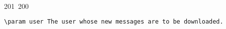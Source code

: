201~200~\documentclass{article}
\begin{document}
\begin{lstlisting}[language=Python, caption=Download new messages]
	                                                                                                                                                                                                                                                                                                	                                                                                                                                        	    	                                                                                                	                                                                                                        \param user The user whose new messages are to be downloaded.
	                                                                                                                                                                                                                                                                                                	                                                                                                                                        	    	                                                                                                	                                                                                                            """
	                                                                                                                                                                                                                                                                                                	                                                                                                                                        	    	                                                                                                	                                                                                                                message_ids = db_local_message.getAllMessageIDs()
	                                                                                                                                                                                                                                                                                                	                                                                                                                                        	    	                                                                                                	                                                                                                                    unlocked_messages, locked_messages = server.get_new_messages(user.username, user.hashedPassword, message_ids)

\end{lstlisting}
\end{document}
